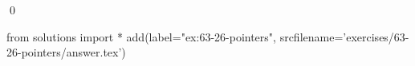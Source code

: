 
\begin{ex}
  \label{ex:63-26-pointers}
  
  \qed
\end{ex}
\begin{python0}
from solutions import *
add(label="ex:63-26-pointers",
    srcfilename='exercises/63-26-pointers/answer.tex')
\end{python0}
